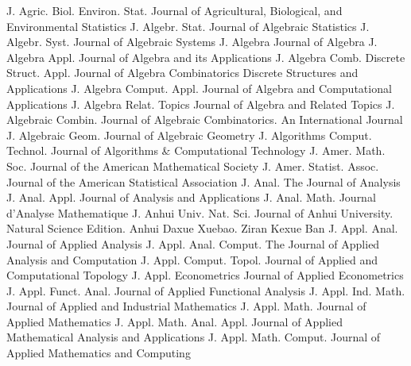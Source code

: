 {J. Agric. Biol. Environ. Stat.}
{Journal of Agricultural, Biological, and Environmental Statistics}
{J. Algebr. Stat.}
{Journal of Algebraic Statistics}
{J. Algebr. Syst.}
{Journal of Algebraic Systems}
{J. Algebra}
{Journal of Algebra}
{J. Algebra Appl.}
{Journal of Algebra and its Applications}
{J. Algebra Comb. Discrete Struct. Appl.}
{Journal of Algebra Combinatorics Discrete Structures and Applications}
{J. Algebra Comput. Appl.}
{Journal of Algebra and Computational Applications}
{J. Algebra Relat. Topics}
{Journal of Algebra and Related Topics}
{J. Algebraic Combin.}
{Journal of Algebraic Combinatorics. An International Journal}
{J. Algebraic Geom.}
{Journal of Algebraic Geometry}
{J. Algorithms Comput. Technol.}
{Journal of Algorithms & Computational Technology}
{J. Amer. Math. Soc.}
{Journal of the American Mathematical Society}
{J. Amer. Statist. Assoc.}
{Journal of the American Statistical Association}
{J. Anal.}
{The Journal of Analysis}
{J. Anal. Appl.}
{Journal of Analysis and Applications}
{J. Anal. Math.}
{Journal d'Analyse Mathematique}
{J. Anhui Univ. Nat. Sci.}
{Journal of Anhui University. Natural Science Edition. Anhui Daxue Xuebao. Ziran Kexue Ban}
{J. Appl. Anal.}
{Journal of Applied Analysis}
{J. Appl. Anal. Comput.}
{The Journal of Applied Analysis and Computation}
{J. Appl. Comput. Topol.}
{Journal of Applied and Computational Topology}
{J. Appl. Econometrics}
{Journal of Applied Econometrics}
{J. Appl. Funct. Anal.}
{Journal of Applied Functional Analysis}
{J. Appl. Ind. Math.}
{Journal of Applied and Industrial Mathematics}
{J. Appl. Math.}
{Journal of Applied Mathematics}
{J. Appl. Math. Anal. Appl.}
{Journal of Applied Mathematical Analysis and Applications}
{J. Appl. Math. Comput.}
{Journal of Applied Mathematics and Computing}
